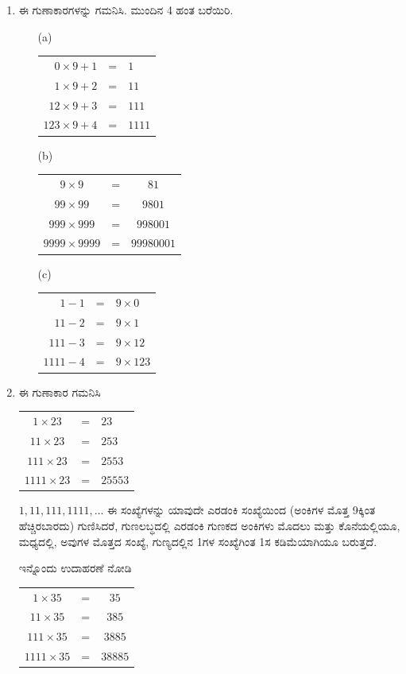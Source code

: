 \begin{enumerate}
\item ಈ ಗುಣಾಕಾರಗಳನ್ನು ಗಮನಿಸಿ. ಮುಂದಿನ 4 ಹಂತ ಬರೆಯಿರಿ. 
\begin{itemize}
\item[(a)]
\begin{tabular}[t]{rcl}
$0\times 9 + 1$ & = & $1$\\
$1\times 9 + 2$ & = & $11$\\
$12\times 9 + 3$ & = & $111$\\
$123\times 9 + 4$ & = & $1111$
\end{tabular}
\item[(b)]
\begin{tabular}[t]{ccc}
$9\times 9$ & = & $81$\\
$99\times 99$ & = & $9801$\\
$999\times 999$ & = & $998001$\\
$9999\times 9999$ & = & $99980001$
\end{tabular}
\item[(c)]
\begin{tabular}[t]{rcl}
$1 - 1$ & = & $9\times 0$\\
$11 - 2$ & = & $9\times 1$\\
$111 - 3$ & = & $9\times 12$\\
$1111 - 4$ & = & $9\times 123$
\end{tabular}
\end{itemize}

\item ಈ ಗುಣಾಕಾರ ಗಮನಿಸಿ 

\begin{tabular}[t]{ccl}
$1\times 23$ & = & $23$\\
$11\times 23$ & = & $253$\\
$111\times 23$ & = & $2553$\\
$1111\times 23$ & = & $25553$
\end{tabular}

$1, 11, 111, 1111, \ldots$ ಈ ಸಂಖ್ಯೆಗಳನ್ನು ಯಾವುದೇ ಎರಡಂಕಿ ಸಂಖ್ಯೆಯಿಂದ (ಅಂಕಿಗಳ ಮೊತ್ತ 9ಕ್ಕಿಂತ ಹೆಚ್ಚಿರಬಾರದು) ಗುಣಿಸಿದರೆ, ಗುಣಲಬ್ಧದಲ್ಲಿ ಎರಡಂಕಿ ಗುಣಕದ ಅಂಕಿಗಳು ಮೊದಲು ಮತ್ತು ಕೊನೆಯಲ್ಲಿಯೂ, ಮಧ್ಯದಲ್ಲಿ, ಅವುಗಳ ಮೊತ್ತದ ಸಂಖ್ಯೆ, ಗುಣ್ಯದಲ್ಲಿನ 1ಗಳ ಸಂಖ್ಯೆಗಿಂತ 1ಸ ಕಡಿಮೆಯಾಗಿಯೂ ಬರುತ್ತದೆ. 

ಇನ್ನೊಂದು ಉದಾಹರಣೆ ನೋಡಿ 

\begin{tabular}[t]{ccc}
$1\times 35$ & = & $35$\\
$11\times 35$ & = & $385$\\
$111\times 35$ & = & $3885$\\
$1111\times 35$ & = & $38885$
\end{tabular}


\end{enumerate}
